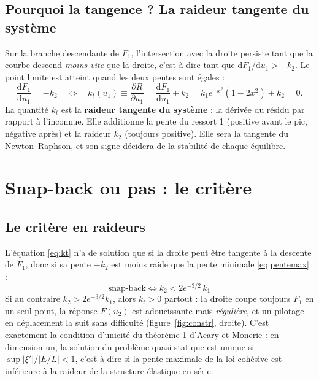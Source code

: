 \documentclass[11pt,a4paper]{article}
\newcommand{\dd}{\mathrm{d}}
\begin{document}
\subsection{Pourquoi la tangence ? La raideur tangente du système}
Sur la branche descendante de $F_1$, l'intersection avec la droite persiste tant que la courbe
descend \emph{moins vite} que la droite, c'est-à-dire tant que $\dd F_1/\dd u_1 > -k_2$. Le point
limite est atteint quand les deux pentes sont égales :
\begin{equation}
  \frac{\dd F_1}{\dd u_1} = -k_2
  \quad\Longleftrightarrow\quad
  k_t(u_1) \equiv \frac{\partial R}{\partial u_1} = \frac{\dd F_1}{\dd u_1} + k_2 = k_1e^{-x^2}(1-2x^2) + k_2 = 0 .
  \label{eq:kt}
\end{equation}
La quantité $k_t$ est la \textbf{raideur tangente du système} : la dérivée du résidu par rapport
à l'inconnue. Elle additionne la pente du ressort 1 (positive avant le pic, négative après) et
la raideur $k_2$ (toujours positive). Elle sera la tangente du Newton--Raphson, et son signe
décidera de la stabilité de chaque équilibre.

\section{Snap-back ou pas : le critère}

\subsection{Le critère en raideurs}
L'équation \eqref{eq:kt} n'a de solution que si la droite peut être tangente à la descente de
$F_1$, donc si sa pente $-k_2$ est moins raide que la pente minimale \eqref{eq:pentemax} :
\begin{equation}
  \boxed{\;\text{snap-back}\iff k_2 < 2e^{-3/2}\,k_1\;}
  \label{eq:crit}
\end{equation}
Si au contraire $k_2 > 2e^{-3/2}k_1$, alors $k_t > 0$ partout : la droite coupe toujours $F_1$ en
un seul point, la réponse $F(u_2)$ est adoucissante mais \emph{régulière}, et un pilotage en
déplacement la suit sans difficulté (figure~\ref{fig:constr}, droite). C'est exactement la
condition d'unicité du théorème 1 d'Acary et Monerie : en dimension un, la solution du problème
quasi-statique est unique si $\sup|\xi'|/|E/L| < 1$, c'est-à-dire si la pente maximale de la loi
cohésive est inférieure à la raideur de la structure élastique en série.
\end{document}
